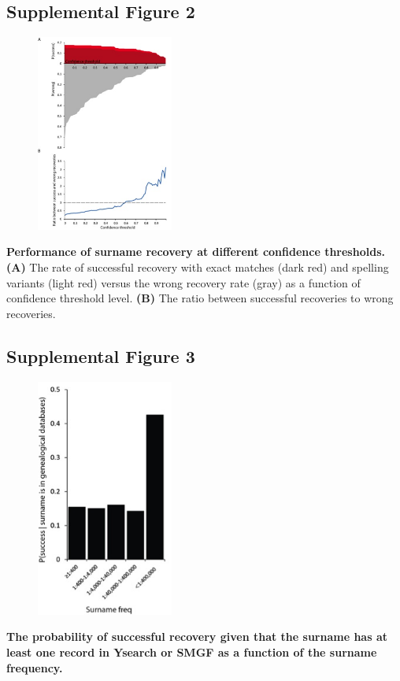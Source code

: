 \subsection{Supplemental Figure 2}
\begin{figure}[h!]
\centering
\label{fig:sursup2}
\includegraphics[width=0.4\textwidth]{Figures/App1/SuppFig2.jpg}
\end{figure}
\textbf{Performance of surname recovery at different confidence thresholds.} \textbf{(A)} The rate of successful recovery with exact matches (dark red) and spelling variants (light red) versus the wrong recovery rate (gray) as a function of confidence threshold level. \textbf{(B)} The ratio between successful recoveries to wrong recoveries.

\pagebreak
\subsection{Supplemental Figure 3}
\begin{figure}[h!]
\centering
\label{fig:sursup3}
\includegraphics[width=0.4\textwidth]{Figures/App1/SuppFig3.jpg}
\end{figure}
\textbf{The probability of successful recovery given that the surname has at least one record in Ysearch or SMGF as a function of the surname frequency.}

